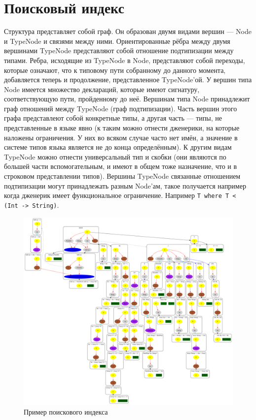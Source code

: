 \documentclass[times]{itmo-student-thesis}
\begin{document}
	\section{Поисковый индекс}
	Структура представляет собой граф. Он образован двумя видами вершин --- Node и TypeNode и связями между ними. Ориентированные рёбра между двумя вершинами TypeNode представляют собой отношение подтипизации между типами. Ребра, исходящие из TypeNode в Node, представляют собой переходы, которые означают, что к типовому пути собранному до данного момента, добавляется теперь и продолжение, представленное TypeNode'ой. У вершин типа Node имеется множество деклараций, которые имеют сигнатуру, соответствующую пути, пройденному до неё. Вершинам типа Node принадлежит граф отношений между TypeNode (граф подтипизации). Часть вершин этого графа представлеют собой конкретные типы, а другая часть --- типы, не представленные в языке явно (к таким можно отнести дженерики, на которые наложены ограничения. У них во всяком случае часто нет имён, а значение в системе типов языка является не до конца определённым). К другим видам TypeNode можно отнести универсальный тип и скобки (они являются по большей части вспомогательным, и имеют в общем тоже назначение, что и в строковом представлении типов). Вершины TypeNode связанные отношением подтипизации могут принадлежать разным Node'ам, такое получается например когда дженерик имеет функциональное ограничение. Например \lstinline{T where T < (Int -> String)}.
	
	\begin{figure}[!h]
		\caption{Пример поискового индекса} \label{fig:1}
		\centering
		\includegraphics[width=0.8\columnwidth]{images/search_index.png}
	\end{figure}
	
\end{document}
